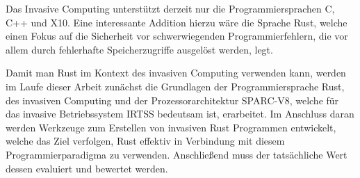 Das Invasive Computing unterstützt derzeit nur die Programmiersprachen C, C++ und X10. Eine interessante Addition 
hierzu wäre die Sprache Rust, welche einen Fokus auf die Sicherheit vor schwerwiegenden Programmierfehlern, die vor 
allem durch fehlerhafte Speicherzugriffe ausgelöst werden, legt.

Damit man Rust im Kontext des invasiven Computing verwenden kann,
werden im Laufe dieser Arbeit zunächst die Grundlagen der Programmiersprache Rust,
des invasiven Computing und der Prozessorarchitektur SPARC-V8, welche für das
invasive Betriebssystem IRTSS bedeutsam ist, erarbeitet. 
Im Anschluss daran werden Werkzeuge zum Erstellen von invasiven
Rust Programmen entwickelt, welche das Ziel verfolgen,
Rust effektiv in Verbindung mit diesem Programmierparadigma zu verwenden.
Anschließend muss der tatsächliche Wert dessen evaluiert und bewertet werden.


